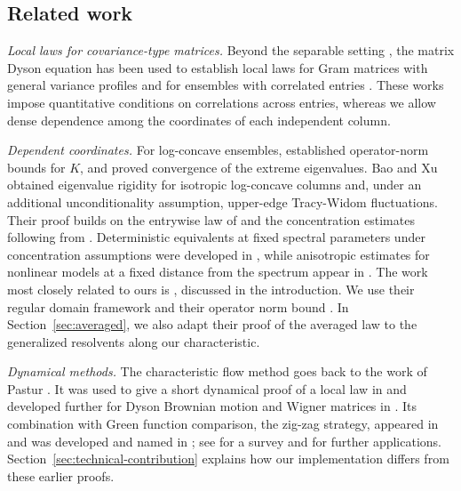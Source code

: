 \documentclass[11pt,reqno]{amsart}
\theoremstyle{definition}
\numberwithin{equation}{section}
\numberwithin{figure}{section}
\begin{document}
\subsection{Related work}

\emph{Local laws for covariance-type matrices.}
Beyond the separable setting \cite{pillai2014universality,bloemendal2014isotropic,knowles2017anisotropic}, the matrix Dyson equation has been used to establish local laws for Gram matrices with general variance profiles and for ensembles with correlated entries \cite{alt2017local,ajanki2019stability,erdos2019random}. These works impose quantitative conditions on correlations across entries, whereas we allow dense dependence among the coordinates of each independent column.


\emph{Dependent coordinates.}
For log-concave ensembles, \cite{adamczak2010quantitative} established operator-norm bounds for $K$, and \cite{chafai2018convergence} proved convergence of the extreme eigenvalues. Bao and Xu \cite{bao2025extreme} obtained eigenvalue rigidity for isotropic log-concave columns and, under an additional unconditionality assumption, upper-edge Tracy-Widom fluctuations. Their proof builds on the entrywise law of \cite{pillai2014universality} and the concentration estimates following from \cite{chen2021almost,klartag2022bourgain}. Deterministic equivalents at fixed spectral parameters under concentration assumptions were developed in \cite{elkaroui2009concentration,louart2018random,louart2018concentration}, while anisotropic estimates for nonlinear models at a fixed distance from the spectrum appear in \cite{wang2024nonlinear,fan2026anisotropic}. The work most closely related to ours is \cite{fan2026anisotropic}, discussed in the introduction. We use their regular domain framework and their operator norm bound \cite[Lemma~3.8]{fan2026anisotropic}. In Section~\ref{sec:averaged}, we also adapt their proof of the averaged law to the generalized resolvents along our characteristic.


\emph{Dynamical methods.}
The characteristic flow method goes back to the work of Pastur \cite{pastur1972spectrum}. It was used to give a short dynamical proof of a local law in \cite{vonsoosten2019random} and developed further for Dyson Brownian motion and Wigner matrices in \cite{huang2019rigidity,adhikari2020dyson,bourgade2021extreme}. Its combination with Green function comparison, the zig-zag strategy, appeared in \cite{cipolloni2022mesoscopic} and was developed and named in \cite{cipolloni2023edge,cipolloni2024out}; see \cite{erdos2025lecture} for a survey and \cite{erdos2024eigenstate,erdos2025cusp,erdos2025zigzag} for further applications. Section~\ref{sec:technical-contribution} explains how our implementation differs from these earlier proofs.
\end{document}

